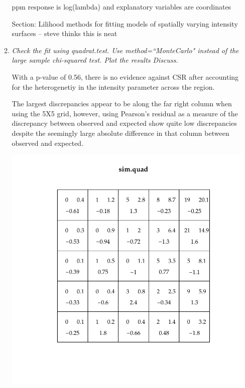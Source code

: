 \documentclass{article}\usepackage[]{graphicx}\usepackage[]{color}
\makeatletter
\def\maxwidth{ %
  \ifdim\Gin@nat@width>\linewidth
    \linewidth
  \else
    \Gin@nat@width
  \fi
}
\newenvironment{knitrout}{}{} %
\makeatother
\begin{document}
\begin{enumerate}
\begin{enumerate}
ppm response is log(lambda) and explanatory variables are coordinates

Section: Lilihood methods for fitting models of spatially varying intensity surfaces -- steve thinks this is neat

\item %
{\it Check the fit using quadrat.test. Use method=``MonteCarlo" instead of the large sample chi-squared test. Plot the results Discuss.}

With a p-value of 0.56, there is no evidence against CSR after accounting for the heterogenetiy in the intensity parameter across the region.

The largest discrepancies appear to be along the far right column when using the 5X5 grid, however, using Pearson's residual as a measure of the discrepancy between observed and expected show quite low discrepancies despite the seemingly large absolute difference in that column between observed and expected. 


\begin{knitrout}\footnotesize
{}\color{fgcolor}

{\centering \includegraphics[width=\maxwidth]{figure/prob2d-1} 

}




\end{knitrout}
\end{enumerate}
\end{enumerate}
\end{document}
